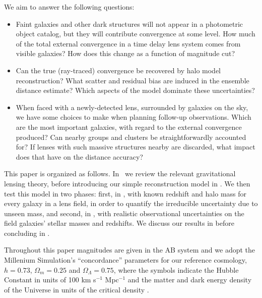 \documentclass[useAMS,usenatbib]{mn2e}
\begin{document}
We aim to answer the following questions:
\begin{itemize}
\item Faint galaxies and other dark structures will not appear in a photometric
object catalog, but they will contribute convergence at some level. How much of
the total external convergence in a time delay lens system comes from visible
galaxies? How does this change as a function of magnitude cut? 
\item Can the true (ray-traced) convergence be recovered by halo model
reconstruction? What scatter and residual bias are induced in the ensemble 
distance estimate? Which aspects of the model dominate these uncertainties? 
\item When faced with a newly-detected lens, surrounded by galaxies on the sky,
we have some choices to make when planning follow-up observations.
Which are the most important galaxies, with regard to the external convergence
produced? Can nearby groups and clusters be straightforwardly accounted for? If
lenses with such massive structures nearby are discarded, what impact does that
have on the distance accuracy?
\end{itemize}

This paper is organized as follows. In~ we review the relevant
gravitational lensing theory, before introducing our simple reconstruction 
model in .  We then test this model in two phases: first, in
, with known redshift and halo mass for every galaxy in a
lens field, in order to quantify the irreducible uncertainty due to unseen mass,
and second, in , with realistic observational uncertainties
on the field galaxies' stellar masses and redshifts.  We discuss our results in  before
concluding in .

Throughout this paper magnitudes are given in the AB system and
we adopt the Millenium Simulation's ``concordance'' parameters for our reference cosmology, \ie
$h=0.73$, $\Omega_m=0.25$ and $\Omega_\Lambda=0.75$, where the symbols indicate
the Hubble Constant in units of 100 km s$^{-1}$ Mpc$^{-1}$ and the matter and
dark energy density of the Universe in units of the critical density
.%


\end{document}
